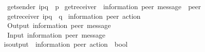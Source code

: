 \begin{isabellebody}
\ \ {\isachardoublequoteopen}get{\isacharunderscore}{\kern0pt}sender\ {\isacharparenleft}{\kern0pt}i\isactrlbsup p{\isasymrightarrow}q\isactrlesup {\isacharparenright}{\kern0pt}\ {\isacharequal}{\kern0pt}\ p{\isachardoublequoteclose}\isanewline
\isanewline
{}\isamarkupfalse%
\ get{\isacharunderscore}{\kern0pt}receiver\ {\isacharcolon}{\kern0pt}{\isacharcolon}{\kern0pt}\ {\isachardoublequoteopen}{\isacharparenleft}{\kern0pt}{\isacharprime}{\kern0pt}information{\isacharcomma}{\kern0pt}\ {\isacharprime}{\kern0pt}peer{\isacharparenright}{\kern0pt}\ message\ {\isasymRightarrow}\ {\isacharprime}{\kern0pt}peer{\isachardoublequoteclose}\ \isanewline
\ \ {\isachardoublequoteopen}get{\isacharunderscore}{\kern0pt}receiver\ {\isacharparenleft}{\kern0pt}i\isactrlbsup p{\isasymrightarrow}q\isactrlesup {\isacharparenright}{\kern0pt}\ {\isacharequal}{\kern0pt}\ q{\isachardoublequoteclose}\isanewline
\isanewline
{}\isamarkupfalse%
\ {\isacharparenleft}{\kern0pt}{\isacharprime}{\kern0pt}information{\isacharcomma}{\kern0pt}\ {\isacharprime}{\kern0pt}peer{\isacharparenright}{\kern0pt}\ action\ {\isacharequal}{\kern0pt}\isanewline
\ \ Output\ {\isachardoublequoteopen}{\isacharparenleft}{\kern0pt}{\isacharprime}{\kern0pt}information{\isacharcomma}{\kern0pt}\ {\isacharprime}{\kern0pt}peer{\isacharparenright}{\kern0pt}\ message{\isachardoublequoteclose}\ \ {\isacharparenleft}{\kern0pt}{\isachardoublequoteopen}{\isacharbang}{\kern0pt}{\isasymlangle}{\isacharunderscore}{\kern0pt}{\isasymrangle}{\isachardoublequoteclose}\ {\isacharbrackleft}{\kern0pt}{}{}{}{\isacharbrackright}{\kern0pt}\ {}{}{}{\isacharparenright}{\kern0pt}\ {\isacharbar}{\kern0pt}\isanewline
\ \ Input\ {\isachardoublequoteopen}{\isacharparenleft}{\kern0pt}{\isacharprime}{\kern0pt}information{\isacharcomma}{\kern0pt}\ {\isacharprime}{\kern0pt}peer{\isacharparenright}{\kern0pt}\ message{\isachardoublequoteclose}\ \ {\isacharparenleft}{\kern0pt}{\isachardoublequoteopen}{\isacharquery}{\kern0pt}{\isasymlangle}{\isacharunderscore}{\kern0pt}{\isasymrangle}{\isachardoublequoteclose}\ {\isacharbrackleft}{\kern0pt}{}{}{}{\isacharbrackright}{\kern0pt}\ {}{}{}{\isacharparenright}{\kern0pt}\isanewline
\isanewline
{}\isamarkupfalse%
\ is{\isacharunderscore}{\kern0pt}output\ {\isacharcolon}{\kern0pt}{\isacharcolon}{\kern0pt}\ {\isachardoublequoteopen}{\isacharparenleft}{\kern0pt}{\isacharprime}{\kern0pt}information{\isacharcomma}{\kern0pt}\ {\isacharprime}{\kern0pt}peer{\isacharparenright}{\kern0pt}\ action\ {\isasymRightarrow}\ bool{\isachardoublequoteclose}\ \isanewline

\end{isabellebody}
